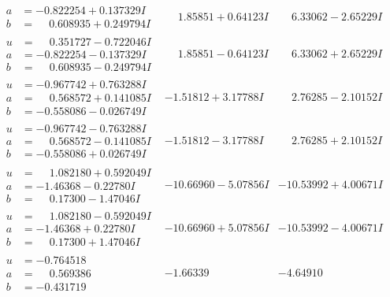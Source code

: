 \documentclass[1p]{elsarticle_modified}
\theoremstyle{definition}
\begin{document}
$$\begin{array}{c|c|c}
\begin{aligned}
a &= -0.822254 + 0.137329 I \\
b &= \phantom{-}0.608935 + 0.249794 I\end{aligned}
 & \phantom{-}1.85851 + 0.64123 I & \phantom{-}6.33062 - 2.65229 I \\ \hline\begin{aligned}
u &= \phantom{-}0.351727 - 0.722046 I \\
a &= -0.822254 - 0.137329 I \\
b &= \phantom{-}0.608935 - 0.249794 I\end{aligned}
 & \phantom{-}1.85851 - 0.64123 I & \phantom{-}6.33062 + 2.65229 I \\ \hline\begin{aligned}
u &= -0.967742 + 0.763288 I \\
a &= \phantom{-}0.568572 + 0.141085 I \\
b &= -0.558086 - 0.026749 I\end{aligned}
 & -1.51812 + 3.17788 I & \phantom{-}2.76285 - 2.10152 I \\ \hline\begin{aligned}
u &= -0.967742 - 0.763288 I \\
a &= \phantom{-}0.568572 - 0.141085 I \\
b &= -0.558086 + 0.026749 I\end{aligned}
 & -1.51812 - 3.17788 I & \phantom{-}2.76285 + 2.10152 I \\ \hline\begin{aligned}
u &= \phantom{-}1.082180 + 0.592049 I \\
a &= -1.46368 - 0.22780 I \\
b &= \phantom{-}0.17300 - 1.47046 I\end{aligned}
 & -10.66960 - 5.07856 I & -10.53992 + 4.00671 I \\ \hline\begin{aligned}
u &= \phantom{-}1.082180 - 0.592049 I \\
a &= -1.46368 + 0.22780 I \\
b &= \phantom{-}0.17300 + 1.47046 I\end{aligned}
 & -10.66960 + 5.07856 I & -10.53992 - 4.00671 I \\ \hline\begin{aligned}
u &= -0.764518\phantom{ +0.000000I} \\
a &= \phantom{-}0.569386\phantom{ +0.000000I} \\
b &= -0.431719\phantom{ +0.000000I}\end{aligned}
 & -1.66339\phantom{ +0.000000I} & -4.64910\phantom{ +0.000000I} \\ \hline\begin{aligned}

\end{aligned}
\end{array}$$
\end{document}

